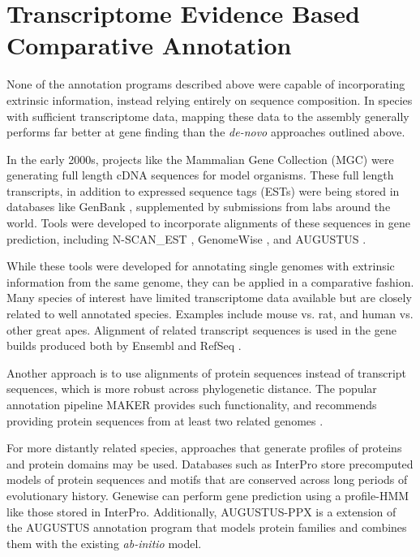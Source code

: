 \documentclass[fleqn,10pt]{wlscirep}
\begin{document}
\section*{Transcriptome Evidence Based Comparative Annotation}

None of the annotation programs described above were capable of incorporating extrinsic information, instead relying entirely on sequence composition. In species with sufficient transcriptome data, mapping these data to the assembly generally performs far better at gene finding than the \textit{de-novo} approaches outlined above. 

In the early 2000s, projects like the Mammalian Gene Collection (MGC) \cite{mammalian2002generation} were generating full length cDNA sequences for model organisms. These full length transcripts, in addition to expressed sequence tags (ESTs) were being stored in databases like GenBank \cite{benson2000genbank}, supplemented by submissions from labs around the world. Tools were developed to incorporate alignments of these sequences in gene prediction, including N-SCAN\_EST \cite{wei2006using},  GenomeWise \cite{birney2004genewise}, and AUGUSTUS \cite{stanke2008using}.

While these tools were developed for annotating single genomes with extrinsic information from the same genome, they can be applied in a comparative fashion. Many species of interest have limited transcriptome data available but are closely related to well annotated species. Examples include mouse vs. rat, and human vs. other great apes. Alignment of related transcript sequences is used in the gene builds produced both by Ensembl \cite{Aken01012016} and RefSeq \cite{pruitt2006ncbi}.

Another approach is to use alignments of protein sequences instead of transcript sequences, which is more robust across phylogenetic distance. The popular annotation pipeline MAKER \cite{cantarel2008maker} provides such functionality, and recommends providing protein sequences from at least two related genomes \cite{yandell2012beginner}. 

For more distantly related species, approaches that generate profiles of proteins and protein domains may be used. Databases such as InterPro \cite{zdobnov2001interproscan} store precomputed models of protein sequences and motifs that are conserved across long periods of evolutionary history. Genewise \cite{birney2004genewise} can perform gene prediction using a profile-HMM like those stored in InterPro. Additionally, AUGUSTUS-PPX \cite{keller2011novel} is a extension of the AUGUSTUS annotation program that models protein families and combines them with the existing \textit{ab-initio} model.
\end{document}
